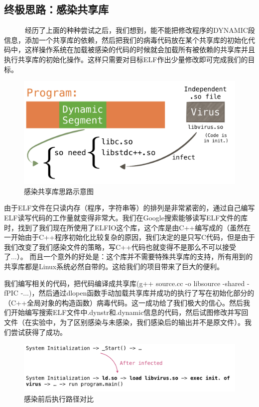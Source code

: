 \documentclass[11pt]{article}
\begin{document}
\subsection{终极思路：感染共享库}
~~~~~~经历了上面的种种尝试之后，我们想到，能不能把修改程序的DYNAMIC段信息，添加一个共享库的依赖，然后把我们的病毒代码放在某个共享库的初始化代码中，这样操作系统在加载被感染的代码的时候就会加载所有被依赖的共享库并且执行共享库的初始化操作。这样只需要对目标ELF作出少量修改即可完成我们的目标。

\begin{figure}[htbp]
		\centering
		\includegraphics[width = \textwidth]{figures/fig4_ld1}
		\caption{感染共享库思路示意图}
		\label{fig:way4}
\end{figure}

由于ELF文件在只读内存（程序，字符串等）的排列是非常紧密的，通过自己编写ELF读写代码的工作量就变得非常大。我们在Google搜索能够读写ELF文件的库时，找到了我们现在所使用了ELFIO这个库，这个库是由C++编写成的（虽然在一开始由于C++程序初始化比较复杂的原因，我们决定的是只写C代码，但是由于我们改变了我们感染文件的策略，写C++代码也就变得不是那么不可以接受了...）。 而且一个意外的好处是：这个库并不需要特殊共享库的支持，所有用到的共享库都是Linux系统必然自带的。这给我们的项目带来了巨大的便利。

我们编写相关的代码，把代码编译成共享库(g++ source.cc -o libsource -shared -fPIC -...)，然后通过dlopen函数手动加载共享库并成功的执行了写在初始化部分的（C++全局对象的构造函数）病毒代码。这一成功给了我们极大的信心。然后我们开始编写搜索ELF文件中.dynstr和.dynamic信息的代码，然后试图修改并写回文件（在实验中，为了区别感染与未感染，我们感染后的输出并不是原文件）。我们尝试获得了成功。
\begin{figure}[htbp]
		\centering
		\includegraphics[width = \textwidth]{figures/fig5_ld2}
		\caption{感染前后执行路径对比}
		\label{fig:way4}
\end{figure}
\end{document}
